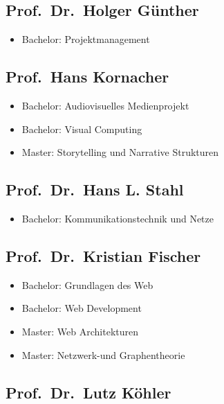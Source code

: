 \subsection{Prof.~Dr.~Holger
Günther}\label{prof.dr.holger-guxfcnther}

\begin{itemize}
\tightlist
\item
  Bachelor: Projektmanagement
\end{itemize}

\subsection{Prof.~Hans Kornacher}\label{prof.hans-kornacher}

\begin{itemize}
\tightlist
\item
  Bachelor: Audiovisuelles Medienprojekt
\item
  Bachelor: Visual Computing
\item
  Master: Storytelling und Narrative Strukturen
\end{itemize}

\subsection{Prof.~Dr.~Hans L. Stahl}\label{prof.dr.hans-l.-stahl}

\begin{itemize}
\tightlist
\item
  Bachelor: Kommunikationstechnik und Netze
\end{itemize}

\subsection{Prof.~Dr.~Kristian
Fischer}\label{prof.dr.kristian-fischer}

\begin{itemize}
\tightlist
\item
  Bachelor: Grundlagen des Web
\item
  Bachelor: Web Development
\item
  Master: Web Architekturen
\item
  Master: Netzwerk-und Graphentheorie
\end{itemize}

\subsection{Prof.~Dr.~Lutz Köhler}\label{prof.dr.lutz-kuxf6hler}

